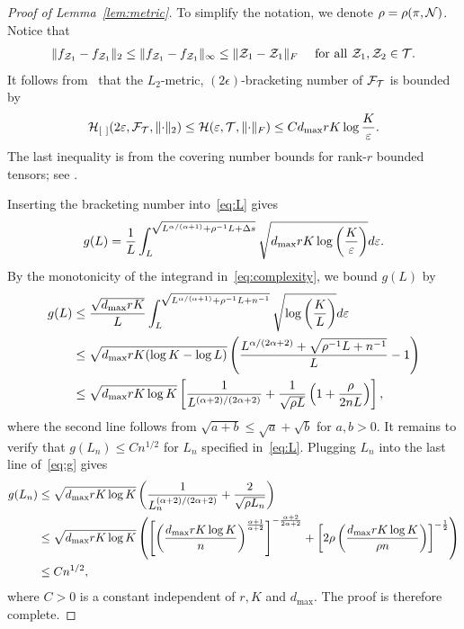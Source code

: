 \documentclass[11pt]{article}
\theoremstyle{plain}
\theoremstyle{definition}
\begin{document}
\begin{proof}[Proof of Lemma~\ref{lem:metric}]
To simplify the notation, we denote $\rho=\rho(\pi, \mathcal{N})$. 
Notice that 
\begin{align}
	\lVert f_{\mathcal{Z}_1}-f_{\mathcal{Z}_1}\rVert_2\leq\|f_{\mathcal{Z}_1}-f_{\mathcal{Z}_1}\|_\infty\leq \lVert\mathcal{Z}_1-\mathcal{Z}_1\rVert_F\quad\text{ for all } \mathcal{Z}_1,\mathcal{Z}_2\in\mathcal{T}.
\end{align}
It follows from~\citet[Theorem 9.22]{kosorok2007introduction} that the $L_2$-metric, $(2\epsilon)$-bracketing number of $\mathcal{F}_{\mathcal{T}}$ is bounded by 
\[
\mathcal{H}_{[\ ]}(2\varepsilon, \mathcal{F}_{\mathcal{T}}, \lVert\cdot\rVert_2)\leq \mathcal{H}(\varepsilon, \mathcal{T}, \lVert\cdot\rVert_F) \leq Cd_{\max}rK\log {K\over \varepsilon}.
\]
The last inequality is from the covering number bounds for rank-$r$ bounded tensors; see \citet[Lemma 3]{mu2014square}.

Inserting the bracketing number into~\eqref{eq:L} gives
\begin{equation}\label{eq:complexity}
g(L)={1\over L}\int^{\sqrt{L^{\alpha/(\alpha+1)}+{\rho^{-1}L}+\Delta s}}_{L}  \sqrt{d_{\max}rK\log\left({K\over \varepsilon}\right)}d\varepsilon.
\end{equation}
By the monotonicity of the integrand in~\eqref{eq:complexity}, we bound $g(L)$ by 
\begin{align}\label{eq:g}
g(L)&\leq {\sqrt{d_{\max}rK}\over L}\int_{L}^{\sqrt{L^{\alpha/(\alpha+1)}+\rho^{-1}L+n^{-1}}}\sqrt{\log \left(K \over L \right)}d\varepsilon\notag \\
&\leq \sqrt{d_{\max}rK(\log K - \log L)}\left({L^{\alpha/(2\alpha+2)}+\sqrt{\rho^{-1}L+n^{-1}} \over L }-1\right)\notag \\
&\leq  \sqrt{d_{\max}rK\log K}\left[ {1\over L^{(\alpha+2)/(2\alpha+2)}}+{1\over \sqrt{\rho L}}\left(1+{\rho\over 2nL}\right)\right],
\end{align}
where the second line follows from $\sqrt{a+b} \leq \sqrt{a}+\sqrt{b}$ for $a,b>0$.
It remains to verify that $g(L_n) \leq Cn^{1/2}$ for $L_n$ specified in~\eqref{eq:L}. Plugging $L_n$ into the last line of~\eqref{eq:g} gives
\begin{align}
g(L_n)&\leq \sqrt{d_{\max}rK\log K}\left( {1\over L_n^{(\alpha+2)/(2\alpha+2)}}+{2\over \sqrt{\rho L_n}}\right)
\\&\leq \sqrt{d_{\max}rK\log K}\left(\left[\left(d_{\max}rK\log K\over n\right)^{\alpha+1\over \alpha+2}\right]^{-{\alpha+2\over2\alpha+2}}+\left[2\rho \left(d_{\max}rK\log K\over \rho n\right)\right]^{-{1\over2}} \right)
\\&\leq Cn^{1/2},
\end{align}
where $C>0$ is a constant independent of $r,K$  and $d_{\text{max}}$. The proof is therefore complete.  
\end{proof}
\end{document}
